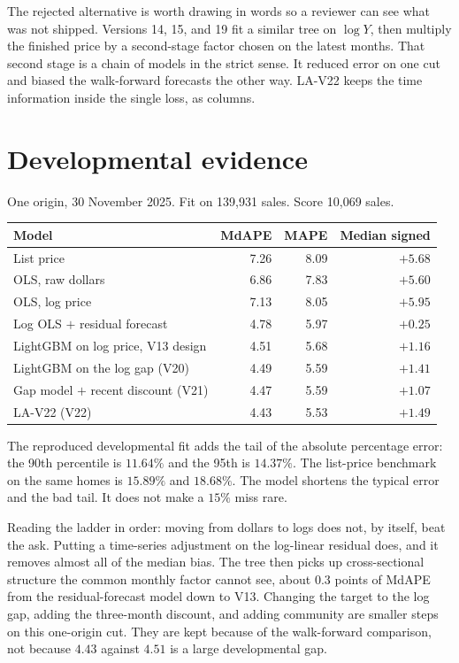 \documentclass[11pt]{article}
\newcommand{\modelid}{LA-V22}
\begin{document}
The rejected alternative is worth drawing in words so a reviewer can see what was not shipped. Versions 14, 15, and 19 fit a similar tree on \(\log Y\), then multiply the finished price by a second-stage factor chosen on the latest months. That second stage is a chain of models in the strict sense. It reduced error on one cut and biased the walk-forward forecasts the other way. \modelid{} keeps the time information inside the single loss, as columns.

\section{Developmental evidence}
\label{sec:develop}

One origin, 30 November 2025. Fit on 139{,}931 sales. Score 10{,}069 sales.

\begin{center}
\begin{tabular}{lrrr}
\toprule
Model & MdAPE & MAPE & Median signed \\
\midrule
List price & 7.26 & 8.09 & \(+5.68\) \\
OLS, raw dollars & 6.86 & 7.83 & \(+5.60\) \\
OLS, log price & 7.13 & 8.05 & \(+5.95\) \\
Log OLS \(+\) residual forecast & 4.78 & 5.97 & \(+0.25\) \\
LightGBM on log price, V13 design & 4.51 & 5.68 & \(+1.16\) \\
LightGBM on the log gap (V20) & 4.49 & 5.59 & \(+1.41\) \\
Gap model \(+\) recent discount (V21) & 4.47 & 5.59 & \(+1.07\) \\
\modelid{} (V22) & 4.43 & 5.53 & \(+1.49\) \\
\bottomrule
\end{tabular}
\end{center}

The reproduced developmental fit adds the tail of the absolute percentage error: the 90th percentile is \(11.64\%\) and the 95th is \(14.37\%\). The list-price benchmark on the same homes is \(15.89\%\) and \(18.68\%\). The model shortens the typical error and the bad tail. It does not make a \(15\%\) miss rare.

Reading the ladder in order: moving from dollars to logs does not, by itself, beat the ask. Putting a time-series adjustment on the log-linear residual does, and it removes almost all of the median bias. The tree then picks up cross-sectional structure the common monthly factor cannot see, about \(0.3\) points of MdAPE from the residual-forecast model down to V13. Changing the target to the log gap, adding the three-month discount, and adding community are smaller steps on this one-origin cut. They are kept because of the walk-forward comparison, not because \(4.43\) against \(4.51\) is a large developmental gap.
\end{document}
